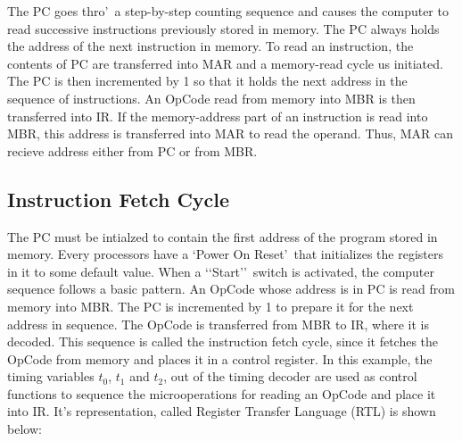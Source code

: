 \documentclass{book}
\begin{document}
The PC goes thro\rq\ a step-by-step counting sequence and causes the computer to read successive instructions previously stored in memory. The PC always holds the address of the next instruction in memory. To read an instruction, the contents of PC are transferred into MAR and a memory-read cycle us initiated. The PC is then incremented by 1 so that it holds the next address in the sequence of instructions. An OpCode read from memory into MBR is then transferred into IR. If the memory-address part of an instruction is read into MBR, this address is transferred into MAR to read the operand. Thus, MAR can recieve address either from PC or from MBR.

\subsection{Instruction Fetch Cycle}

The PC must be intialzed to contain the first address of the program stored in memory. Every processors have a \lq Power On Reset\rq\ that initializes the registers in it to some default value. When a \lq\lq Start\rq\rq\ switch is activated, the computer sequence follows a basic pattern. An OpCode whose address is in PC is read from memory into MBR. The PC is incremented by 1 to prepare it for the next address in sequence. The OpCode is transferred from MBR to IR, where it is decoded. This sequence is called the instruction fetch cycle, since it fetches the OpCode from memory and places it in a control register. In this example, the timing variables $t_0$, $t_1$ and $t_2$, out of the timing decoder are used as control functions to sequence the microoperations for reading an OpCode and place it into IR. It\rq s representation, called Register Transfer Language (RTL) is shown below:\\[.5pt]
\end{document}
